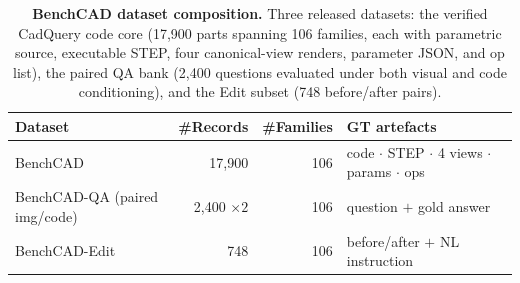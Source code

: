 \begin{table}[t]
\centering
\small
\caption{\textbf{BenchCAD dataset composition.} Three released datasets: the verified CadQuery code core (17{,}900 parts spanning 106 families, each with parametric source, executable STEP, four canonical-view renders, parameter JSON, and op list), the paired QA bank (2{,}400 questions evaluated under both visual and code conditioning), and the Edit subset (748 before/after pairs).}
\label{tab:dataset}
\begin{tabular}{lrrl}
\toprule
Dataset & \#Records & \#Families & GT artefacts \\
\midrule
BenchCAD                     & 17{,}900             & 106 & code $\cdot$ STEP $\cdot$ 4 views $\cdot$ params $\cdot$ ops \\
BenchCAD-QA (paired img/code)& 2{,}400 $\times 2$   & 106 & question $+$ gold answer \\
BenchCAD-Edit                & 748                  & 106 & before/after $+$ NL instruction \\
\bottomrule
\end{tabular}
\end{table}
